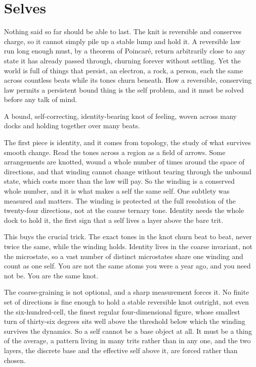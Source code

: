 \section{Selves}

Nothing said so far should be able to last. The knit is reversible and conserves charge, so it cannot simply pile up a stable lump and hold it. A reversible law run long enough must, by a theorem of Poincar\'e, return arbitrarily close to any state it has already passed through, churning forever without settling. Yet the world is full of things that persist, an electron, a rock, a person, each the same across countless beats while its tones churn beneath. How a reversible, conserving law permits a persistent bound thing is the self problem, and it must be solved before any talk of mind.

\begin{definition}[Self]
A bound, self-correcting, identity-bearing knot of feeling, woven across many docks and holding together over many beats.
\end{definition}

The first piece is identity, and it comes from topology, the study of what survives smooth change. Read the tones across a region as a field of arrows. Some arrangements are knotted, wound a whole number of times around the space of directions, and that winding cannot change without tearing through the unbound state, which costs more than the law will pay. So the winding is a conserved whole number, and it is what makes a self the same self. One subtlety was measured and matters. The winding is protected at the full resolution of the twenty-four directions, not at the coarse ternary tone. \cite{pollard2026vibetest} Identity needs the whole dock to hold it, the first sign that a self lives a layer above the bare trit.

This buys the crucial trick. The exact tones in the knot churn beat to beat, never twice the same, while the winding holds. Identity lives in the coarse invariant, not the microstate, so a vast number of distinct microstates share one winding and count as one self. You are not the same atoms you were a year ago, and you need not be. You are the same knot.

The coarse-graining is not optional, and a sharp measurement forces it. No finite set of directions is fine enough to hold a stable reversible knot outright, not even the six-hundred-cell, the finest regular four-dimensional figure, whose smallest turn of thirty-six degrees sits well above the threshold below which the winding survives the dynamics. So a self cannot be a base object at all. It must be a thing of the average, a pattern living in many trits rather than in any one, and the two layers, the discrete base and the effective self above it, are forced rather than chosen.

